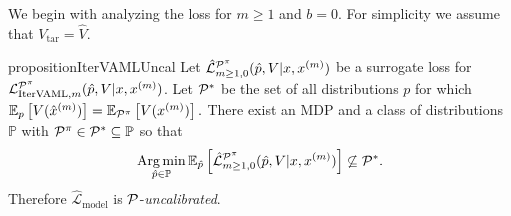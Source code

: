 We begin with analyzing the loss for $m\geq1$ and $b=0$.
For simplicity we assume that $V_\mathrm{tar} = \hat{V}$.
\begin{restatable}{proposition}{IterVAMLUncal}\label{prop:cvaml:2_1}
    Let $\hat{\mathcal{L}}^{\P^\pi}_{m\geq1,0}(\hat{p},V|x,x^{(m)})$ be a surrogate loss for $\mathcal{L}_{\mathrm{IterVAML}, m}^{\P^\pi}(\hat{p}, V|x, x^{(m)})$.
    Let $\P^*$ be the set of all distributions $p$ for which $\EEX{p}{V(\hat{x}^{(m)})} = \EEX{\P^\pi}{V(x^{(m)})}.$
    There exist an MDP and a class of distributions $\mathbb{P}$ with $\P^\pi \in \P^* \subseteq \mathbb{P}$ so that $$\Argmin_{\hat{p} \in \mathbb{P}} \mathbb{E}_{\hat{p}}\left[\hat{\mathcal{L}}^{\P^\pi}_{m\geq1,0}(\hat{p},V|x,x^{(m)})\right] \not\subseteq \P^*.$$
    Therefore $\hat{\mathcal{L}}_\mathrm{model}$ is $\P$-\emph{uncalibrated}.
\end{restatable}
